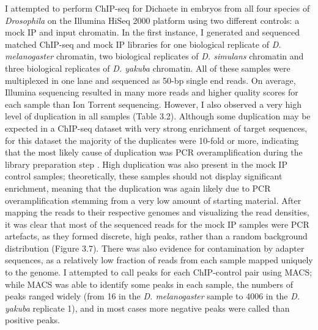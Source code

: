 I attempted to perform ChIP-seq for Dichaete in embryos from all four species of \emph{Drosophila} on the Illumina HiSeq 2000 platform using two different controls: a mock IP and input chromatin. In the first instance, I generated and sequenced matched ChIP-seq and mock IP libraries for one biological replicate of \emph{D. melanogaster} chromatin, two biological replicates of \emph{D. simulans} chromatin and three biological replicates of \emph{D. yakuba} chromatin. All of these samples were multiplexed in one lane and sequenced as 50-bp single end reads. On average, Illumina sequencing resulted in many more reads and higher quality scores for each sample than Ion Torrent sequencing. However, I also observed a very high level of duplication in all samples (Table 3.2). Although some duplication may be expected in a ChIP-seq dataset with very strong enrichment of target sequences, for this dataset the majority of the duplicates were 10-fold or more, indicating that the most likely cause of duplication was PCR overamplification during the library preparation step \citep{bardet_computational_2011}. High duplication was also present in the mock IP control samples; theoretically, these samples should not display significant enrichment, meaning that the duplication was again likely due to PCR overamplification stemming from a very low amount of starting material. After mapping the reads to their respective genomes and visualizing the read densities, it was clear that most of the sequenced reads for the mock IP samples were PCR artefacts, as they formed discrete, high peaks, rather than a random background distribution (Figure 3.7). There was also evidence for contamination by adapter sequences, as a relatively low fraction of reads from each sample mapped uniquely to the genome. I attempted to call peaks for each ChIP-control pair using MACS; while MACS was able to identify some peaks in each sample, the numbers of peaks ranged widely (from 16 in the \emph{D. melanogaster} sample to 4006 in the \emph{D. yakuba} replicate 1), and in most cases more negative peaks were called than positive peaks.\\

